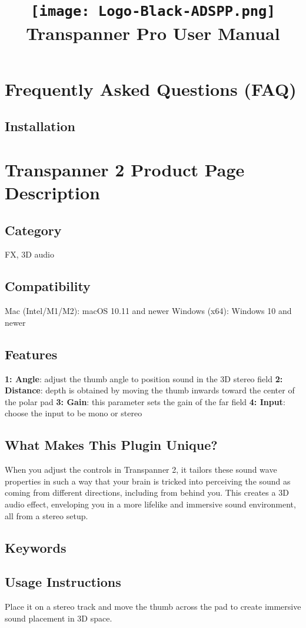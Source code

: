 \documentclass[8pt]{article}
\title{\vspace{-5em}%
\begin{center}%
\texttt{[image: Logo-Black-ADSPP.png]}\\[1em]%
\huge\textbf{Transpanner Pro User Manual}%
\end{center}%
\vspace{-1.5em}}
\date{}
\begin{document}
\section*{Frequently Asked Questions (FAQ)}

\subsection*{Installation}
\section*{Transpanner 2 Product Page Description}

\subsection*{Category}
FX, 3D audio

\subsection*{Compatibility}
Mac (Intel/M1/M2): macOS 10.11 and newer
Windows (x64): Windows 10 and newer

\subsection*{Features}
\textbf{1: Angle}: adjust the thumb angle to position sound in the 3D stereo field
\textbf{2: Distance}: depth is obtained by moving the thumb inwards toward the center of the polar pad
\textbf{3: Gain}: this parameter sets the gain of the far field
\textbf{4: Input}: choose the input to be mono or stereo

\subsection*{What Makes This Plugin Unique?}
When you adjust the controls in Transpanner 2, it tailors these sound wave properties in such a way that your brain is tricked into perceiving the sound as coming from different directions, including from behind you. This creates a 3D audio effect, enveloping you in a more lifelike and immersive sound environment, all from a stereo setup.

\subsection*{Keywords}


\subsection*{Usage Instructions}
Place it on a stereo track and move the thumb across the pad to create immersive sound placement in 3D space. 
\end{document}
